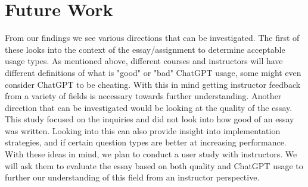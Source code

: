 \documentclass[manuscript,screen,acmsmall]{acmart}
\begin{document}

    
    

    
    



\section{Future Work}
    From our findings we see various directions that can be investigated. The first of these looks into the context of the essay/assignment to determine acceptable usage types. As mentioned above, different courses and instructors will have different definitions of what is "good" or "bad" ChatGPT usage, some might even consider ChatGPT to be cheating. With this in mind getting instructor feedback from a variety of fields is necessary towards further understanding. Another direction that can be investigated would be looking at the quality of the essay. This study focused on the inquiries and did not look into how good of an essay was written. Looking into this can also provide insight into implementation strategies, and if certain question types are better at increasing performance. With these ideas in mind, we plan to conduct a user study with instructors. We will ask them to evaluate the essay based on both quality and ChatGPT usage to further our understanding of this field from an instructor perspective. 
    
\end{document}
